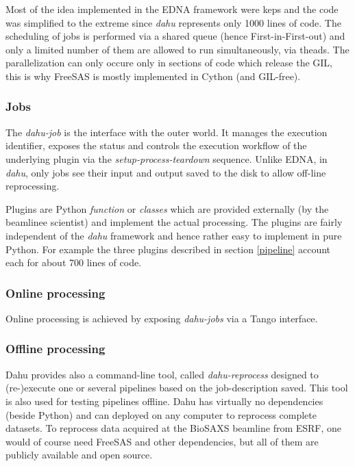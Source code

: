 \documentclass[preprint]{iucr}              %
\begin{document}
Most of the idea implemented in the EDNA framework were keps and the code was simplified to the extreme since \textit{dahu} represents only 1000 lines of code. 
The scheduling of jobs is performed via a shared queue (hence First-in-First-out) and only a limited number of them are allowed to run simultaneously, via theads.
The parallelization can only occure only in sections of code which release the GIL, this is why FreeSAS is mostly implemented in Cython (and GIL-free).      

\subsubsection{Jobs}

The \textit{dahu-job} is the interface with the outer world. 
It manages the execution identifier, exposes the status and controls the execution workflow of the underlying plugin via the \textit{setup-process-teardown} sequence.
Unlike EDNA, in \textit{dahu}, only jobs see their input and output saved to the disk to allow off-line reprocessing.   

Plugins are Python \textit{function} or \textit{classes} which are provided externally (by the beamlinee scientist) and implement the actual processing.
The plugins are fairly independent of the \textit{dahu} framework and hence rather easy to implement in pure Python.
For example the three plugins described in section \ref{pipeline} account each for about 700 lines of code.  

\subsubsection{Online processing}
Online processing is achieved by exposing \textit{dahu-jobs} via a Tango interface.

\subsubsection{Offline processing}
Dahu provides also a command-line tool, called \textit{dahu-reprocess} designed to (re-)execute one or several pipelines based on the job-description saved. 
This tool is also used for testing pipelines offline.
Dahu has virtually no dependencies (beside Python) and can deployed on any computer to reprocess complete datasets. 
To reprocess data acquired at the BioSAXS beamline from ESRF, one would of course need FreeSAS and other dependencies, but all of them are publicly available and open source.
\end{document}
